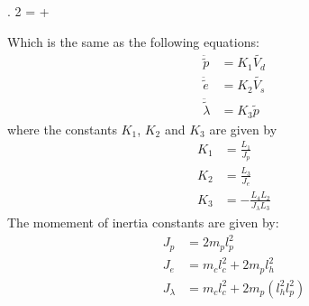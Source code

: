 {\left. {} 2 = \left[ {\begin{array}{*{20}{c}}
0&0&0\\
0&0&0\\
{{K_3}}&0&0
\end{array}} \right] + \left[ {\begin{array}{*{20}{c}}
{{K_1}}&0\\
0&{{K_2}}\\
0&0
\end{array}} \right]

Which is the same as the following equations:
\begin{subequations} \label{linearizedEquations}
\begin{align}
    \ddot{\tilde{p}} &= K_1 \tilde{V_d}\label{subeq1} \\
    \ddot{\tilde{e}} &= K_2 \tilde{V_s}\label{subeq2} \\
    \ddot{\tilde{\lambda}} &= K_3 \tilde{p}\label{eq:Travel_ddot}
\end{align}
\end{subequations}
\noindent where the constants $K_1$, $K_2$ and $K_3$ are given by
\begin{subequations}
\begin{align}
    K_1 &= \frac{L_1}{J_p}  \\
    K_2 &= \frac{L_3}{J_e} \\
    K_3 &= -\frac{L_4 L_2}{J_\lambda L_3}
\end{align}
\end{subequations}
The momement of inertia constants are given by:
\begin{subequations}
\begin{align}
    J_p &= 2 m_p l_p^2 \\
    J_e &= m_c l_c^2 + 2 m_p l_h^2 \\
    J_\lambda &= m_c l_c^2 + 2 m_p (l_h^2 l_p^2)
\end{align}
\end{subequations}

}
